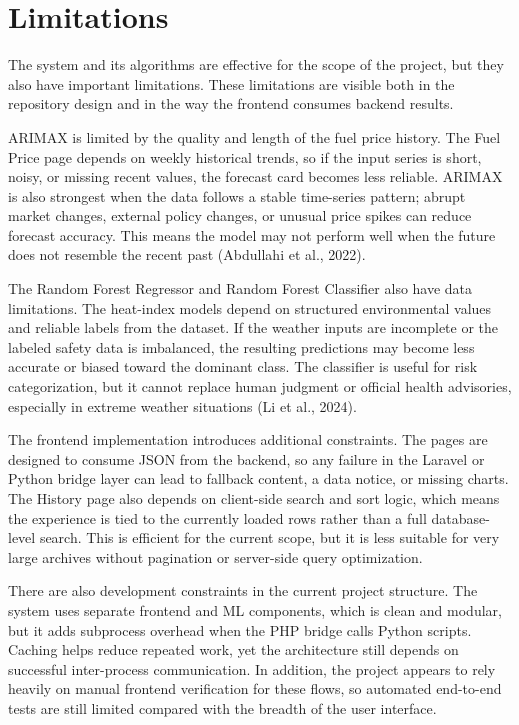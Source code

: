 \documentclass[12pt]{article}
\begin{document}
\newpage
\section{Limitations}

The system and its algorithms are effective for the scope of the project, but they also have important limitations. These limitations are visible both in the repository design and in the way the frontend consumes backend results.

ARIMAX is limited by the quality and length of the fuel price history. The Fuel Price page depends on weekly historical trends, so if the input series is short, noisy, or missing recent values, the forecast card becomes less reliable. ARIMAX is also strongest when the data follows a stable time-series pattern; abrupt market changes, external policy changes, or unusual price spikes can reduce forecast accuracy. This means the model may not perform well when the future does not resemble the recent past (Abdullahi et al., 2022).

The Random Forest Regressor and Random Forest Classifier also have data limitations. The heat-index models depend on structured environmental values and reliable labels from the dataset. If the weather inputs are incomplete or the labeled safety data is imbalanced, the resulting predictions may become less accurate or biased toward the dominant class. The classifier is useful for risk categorization, but it cannot replace human judgment or official health advisories, especially in extreme weather situations (Li et al., 2024).

The frontend implementation introduces additional constraints. The pages are designed to consume JSON from the backend, so any failure in the Laravel or Python bridge layer can lead to fallback content, a data notice, or missing charts. The History page also depends on client-side search and sort logic, which means the experience is tied to the currently loaded rows rather than a full database-level search. This is efficient for the current scope, but it is less suitable for very large archives without pagination or server-side query optimization.

There are also development constraints in the current project structure. The system uses separate frontend and ML components, which is clean and modular, but it adds subprocess overhead when the PHP bridge calls Python scripts. Caching helps reduce repeated work, yet the architecture still depends on successful inter-process communication. In addition, the project appears to rely heavily on manual frontend verification for these flows, so automated end-to-end tests are still limited compared with the breadth of the user interface.
\end{document}
